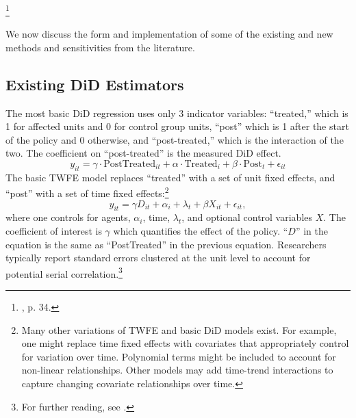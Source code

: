 \documentclass[12pt]{article}
\begin{document}
\begin{singlespace*}
\footnote{\citet{wooldridge2021two}, p. 34.}
\end{singlespace*}
\noindent We now discuss the form and implementation of some of the existing and new methods and sensitivities from the literature.
\subsection{Existing DiD Estimators}
The most basic DiD regression uses only 3 indicator variables: “treated,” which is 1 for affected units and 0 for control group units, “post” which is 1 after the start of the policy and 0 otherwise, and “post-treated,” which is the interaction of the two. The coefficient on “post-treated” is the measured DiD effect.
\begin{equation}
    y_{it} = \gamma \cdot \text{PostTreated}_{it} + \alpha\cdot \text{Treated}_i + \beta \cdot \text{Post}_t + \epsilon_{it}
\end{equation}
The basic TWFE model replaces “treated” with a set of unit fixed effects, and “post” with a set of time fixed effects:\footnote{Many other variations of TWFE and basic DiD models exist. For example, one might replace time fixed effects with covariates that appropriately control for variation over time. Polynomial terms might be included to account for non-linear relationships. Other models may add time-trend interactions to capture changing covariate relationships over time.}
\begin{equation}
    y_{it} = \gamma D_{it} + \alpha_i + \lambda_t + \beta X_{it} + \epsilon_{it},    
\end{equation}
where one controls for agents, $\alpha_i$, time, $\lambda_t$, and optional control variables $X$. The coefficient of interest is $\gamma$ which quantifies the effect of the policy. “$D$” in the equation is the same as “PostTreated” in the previous equation. Researchers typically report standard errors clustered at the unit level to account for potential serial correlation.\footnote{For further reading, see \citet{bertrand2004}.} 
\end{document}
